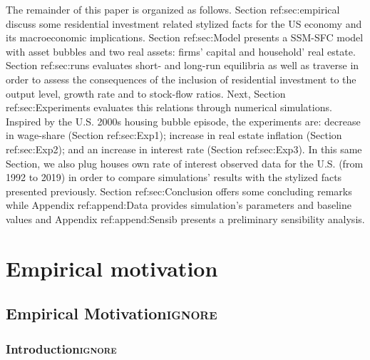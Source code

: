 \documentclass[12pt]{article}
\begin{document}
The remainder of this paper is organized as follows.
Section ref:sec:empirical discuss some residential investment related stylized facts for the US economy and its macroeconomic implications.
Section ref:sec:Model presents a SSM-SFC model  with asset bubbles and two real assets: firms' capital and household' real estate. 
Section ref:sec:runs evaluates short- and long-run equilibria as well as traverse in order to assess the consequences  of the inclusion of residential investment to the output level, growth rate and to stock-flow ratios.
Next, Section ref:sec:Experiments evaluates this relations through numerical simulations.
Inspired by the U.S. 2000s housing bubble episode, the experiments are: decrease in wage-share (Section ref:sec:Exp1); increase in real estate inflation (Section ref:sec:Exp2); and an increase in interest rate (Section ref:sec:Exp3).
In this same Section, we also plug houses own rate of interest observed data for the U.S. (from 1992 to 2019) in order to compare simulations' results with the stylized facts presented previously.
Section ref:sec:Conclusion offers some concluding remarks while Appendix ref:append:Data provides simulation's parameters and baseline values and Appendix ref:append:Sensib presents a preliminary sensibility analysis.



\section{Empirical motivation}
\label{sec:org1cf38d0}
\label{sec:empirical}

\subsection{Empirical Motivation\hfill{}\textsc{ignore}}
\label{sec:orgb9490c4}

\subsubsection{Introduction\hfill{}\textsc{ignore}}
\label{sec:org85e662b}
\end{document}

